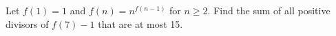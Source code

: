 Let $ f(1)=1 $ and $ f(n)=n^{f(n-1)}$ for $ n\ge2 $. Find the sum of all positive divisors of $ f(7)-1 $ that are at most 15.
